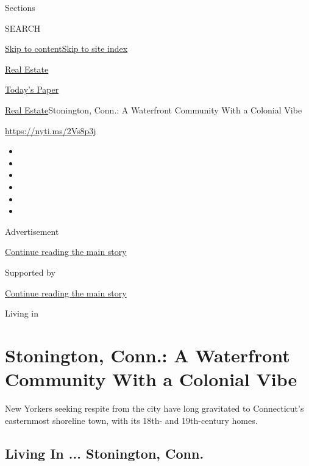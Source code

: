 Sections

SEARCH

\protect\hyperlink{site-content}{Skip to
content}\protect\hyperlink{site-index}{Skip to site index}

\href{https://www.nytimes.com/section/realestate}{Real Estate}

\href{https://myaccount.nytimes.com/auth/login?response_type=cookie\&client_id=vi}{}

\href{https://www.nytimes.com/section/todayspaper}{Today's Paper}

\href{/section/realestate}{Real Estate}\textbar{}Stonington, Conn.: A
Waterfront Community With a Colonial Vibe

\url{https://nyti.ms/2Vs8p3j}

\begin{itemize}
\item
\item
\item
\item
\item
\item
\end{itemize}

Advertisement

\protect\hyperlink{after-top}{Continue reading the main story}

Supported by

\protect\hyperlink{after-sponsor}{Continue reading the main story}

Living in

\hypertarget{stonington-conn-a-waterfront-community-with-a-colonial-vibe}{%
\section{Stonington, Conn.: A Waterfront Community With a Colonial
Vibe}\label{stonington-conn-a-waterfront-community-with-a-colonial-vibe}}

New Yorkers seeking respite from the city have long gravitated to
Connecticut's easternmost shoreline town, with its 18th- and
19th-century homes.

\href{https://www.nytimes.com/slideshow/2020/04/22/realestate/living-in-stonington-conn.html}{}

\hypertarget{living-in--stonington-conn}{%
\subsection{Living In ... Stonington,
Conn.}\label{living-in--stonington-conn}}


